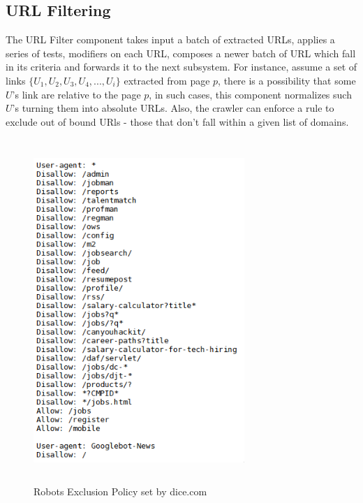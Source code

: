 \subsection{URL Filtering}\label{urlfilter}
The URL Filter component takes input a batch of extracted URLs, applies a series of tests, modifiers on each URL, composes a newer batch of URL which fall in its
criteria and forwards it to the next subsystem. For instance, assume a set of links $\{U_1,U_2,U_3,U_4,...,U_i\}$ extracted from page $p$, there is a possibility that some $U$'s link are relative to the page $p$, in
such cases, this component normalizes such $U$'s turning them into absolute URLs. Also, the crawler can
enforce a rule to exclude out of bound URls - those that don't fall within a given list of domains. 

\begin{figure}[h!]
  \centering
  \includegraphics[width=8cm,height=13cm,keepaspectratio]{../media/crawler/robots-txt-sample.png}
  \caption{Robots Exclusion Policy set by dice.com}
  \label{fig:robotsdice}
\end{figure}

